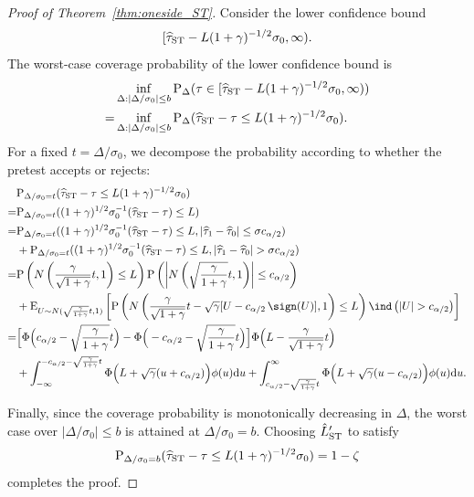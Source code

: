 \documentclass[11pt]{article}
\def\P{{\mathrm P}}
\def\E{{\mathrm E}}
\def\d{{\mathrm d}}
\newcommand{\htau}{\widehat\tau}
\numberwithin{equation}{section}
\theoremstyle{definition}
\begin{document}
\begin{proof}[Proof of Theorem~\ref{thm:oneside_ST}]
Consider the lower confidence bound
\[
  [\htau_{\rm ST} - L (1+\gamma)^{-1/2} \sigma_0, \infty).
\]
The worst-case coverage probability of the lower confidence bound is
\begin{align*}
  & \inf_{\Delta: \lvert \Delta/\sigma_0 \rvert \le b} \P_\Delta(\tau \in [\htau_{\rm ST} - L (1+\gamma)^{-1/2} \sigma_0, \infty))\\
  =& \inf_{\Delta: \lvert \Delta/\sigma_0 \rvert \le b} \P_\Delta(\htau_{\rm ST} - \tau \le L (1+\gamma)^{-1/2} \sigma_0).
\end{align*}
For a fixed $t=\Delta/\sigma_0$, we decompose the probability
according to whether the pretest accepts or rejects:
\begin{align*}
  &\P_{\Delta/\sigma_0 = t}(\htau_{\rm ST} - \tau \le L (1+\gamma)^{-1/2} \sigma_0)\\
  =&\P_{\Delta/\sigma_0 = t}((1+\gamma)^{1/2} \sigma_0^{-1} (\htau_{\rm ST} - \tau) \le L)\\
  =&\P_{\Delta/\sigma_0 = t}((1+\gamma)^{1/2} \sigma_0^{-1} (\htau_{\rm ST} - \tau) \le L, \lvert \htau_1 - \htau_0 \rvert \le \sigma c_{\alpha/2}) \\
  &+ \P_{\Delta/\sigma_0 = t}((1+\gamma)^{1/2} \sigma_0^{-1} (\htau_{\rm ST} - \tau) \le L, \lvert \htau_1 - \htau_0 \rvert > \sigma c_{\alpha/2})\\ 
  =& \P\left( N\left(\frac{\gamma}{\sqrt{1+\gamma}} t, 1\right) \le L \right) \P\left( \left\lvert N\left(\sqrt{\frac{\gamma}{1+\gamma}} t, 1\right) \right\rvert \le c_{\alpha/2} \right)\\
  &+ \E_{U \sim N(\sqrt{\frac{\gamma}{1+\gamma}} t, 1)}\left[\P\left(N\left(\frac{\gamma}{\sqrt{1+\gamma}} t - \sqrt{\gamma} [U - c_{\alpha/2}\,\sign(U)], 1\right) \le L \right) \ind\left(\lvert U \rvert > c_{\alpha/2}\right)\right]\\
  =& \Big[\Phi\Big(c_{\alpha/2} - \sqrt{\frac{\gamma}{1+\gamma}}t \Big) - \Phi\Big(-c_{\alpha/2} - \sqrt{\frac{\gamma}{1+\gamma}}t \Big)\Big]\Phi\Big(L - \frac{\gamma}{\sqrt{1+\gamma}}t \Big)\\
  &+ \int_{-\infty}^{-c_{\alpha/2} - \sqrt{\frac{\gamma}{1+\gamma}}t} \Phi\Big(L + \sqrt{\gamma} (u+c_{\alpha/2})\Big)\phi(u) \d u + \int_{c_{\alpha/2} - \sqrt{\frac{\gamma}{1+\gamma}}t}^\infty \Phi\Big(L + \sqrt{\gamma} (u-c_{\alpha/2})\Big)\phi(u) \d u.
\end{align*}

Finally, since the coverage probability is monotonically decreasing in $\Delta$, the worst case over
$\lvert \Delta/\sigma_0\rvert\le b$ is attained at $\Delta/\sigma_0 = b$. Choosing $\hat L_{\rm ST}'$ to satisfy
\[
  \P_{\Delta/\sigma_0 = b}(\htau_{\rm ST}- \tau \le L (1+\gamma)^{-1/2} \sigma_0) = 1-\zeta
\]
completes the proof.

\end{proof}
\end{document}
